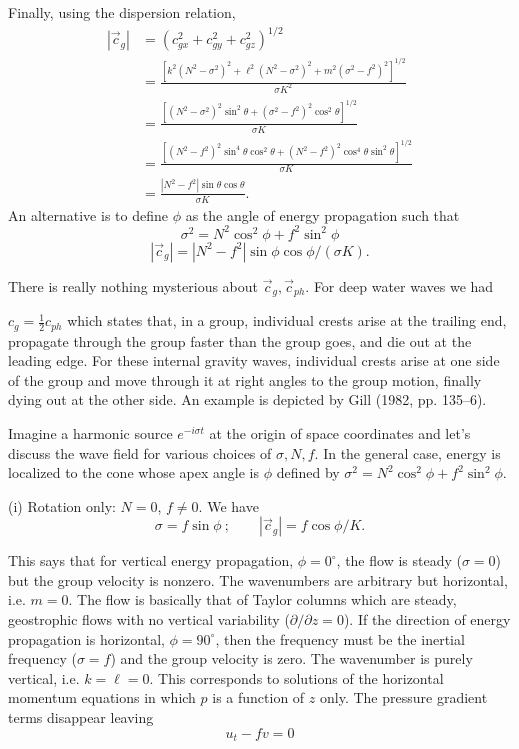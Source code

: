Finally, using the dispersion relation,
\begin{align*}
	|\vec c_g|
	 & =\left(c_{gx}^2+c_{gy}^2+c_{gz}^2\right)^{1/2}            \\
	 & =\frac{[k^2(N^2-\sigma^2)^2+\ell^2(N^2-\sigma^2)^2
			    +m^2(\sigma^2-f^2)^2]^{1/2}}{\sigma K^2}         \\
	 & =\frac{[(N^2-\sigma^2)^2\sin^2\theta
			    +(\sigma^2-f^2)^2\cos^2\theta]^{1/2}}{\sigma K}        \\
	 & =\frac{[(N^2-f^2)^2\sin^4\theta\cos^2\theta
			    +(N^2-f^2)^2\cos^4\theta\sin^2\theta]^{1/2}}{\sigma K} \\
	 & =\frac{|N^2-f^2|\sin\theta\cos\theta}{\sigma K}.
\end{align*}
An alternative is to define $\phi$ as the angle of energy propagation such that
\[
	\sigma^2=N^2\cos^2\phi+f^2\sin^2\phi
\]
\[
	|\vec c_g|=|N^2-f^2|\sin\phi\cos\phi/(\sigma K).
\]


There is really nothing mysterious about $\vec c_g,\vec c_{ph}$. For deep water waves we had

\sourcepagebreak

$c_g=\frac12c_{ph}$ which states that, in a group, individual crests arise at the trailing end,
propagate through the group faster than the group goes, and die out at the leading
edge. For these internal gravity waves, individual crests arise at one side of the group
and move through it at right angles to the group motion, finally dying out at the other
side. An example is depicted by Gill (1982, pp. 135--6).

Imagine a harmonic source $e^{-i\sigma t}$ at the origin of space coordinates and let's
discuss the wave field for various choices of $\sigma,N,f$. In the general case, energy is
localized to the cone whose apex angle is $\phi$ defined by
$\sigma^2=N^2\cos^2\phi+f^2\sin^2\phi$.

(i) Rotation only: $N=0$, $f\ne0$. We have
\[
	\sigma=f\sin\phi\ ;\qquad |\vec c_g|=f\cos\phi/K.
\]


This says that for vertical energy propagation, $\phi=0^\circ$, the flow is steady ($\sigma=0$) but
the group velocity is nonzero. The wavenumbers are arbitrary but horizontal, i.e.
$m=0$. The flow is basically that of Taylor columns which are steady, geostrophic flows
with no vertical variability ($\partial/\partial z=0$). If the direction of energy propagation is
horizontal, $\phi=90^\circ$, then the frequency must be the inertial frequency ($\sigma=f$) and the
group velocity is zero. The wavenumber is purely vertical, i.e. $k=\ell=0$. This
corresponds to solutions of the horizontal momentum equations in which $p$ is a
function of $z$ only. The pressure gradient terms disappear leaving
\[
	u_t-fv=0
\]

